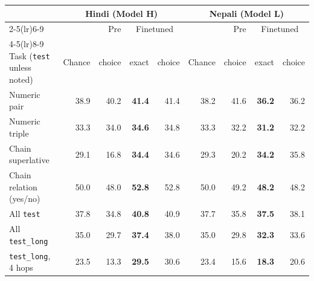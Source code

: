 \begin{tabular}{lrrrrrrrr}
\toprule
& \multicolumn{4}{c}{Hindi (Model H)} & \multicolumn{4}{c}{Nepali (Model L)} \\
\cmidrule(lr){2-5}\cmidrule(lr){6-9}
& & Pre & \multicolumn{2}{c}{Finetuned} & & Pre & \multicolumn{2}{c}{Finetuned} \\
\cmidrule(lr){4-5}\cmidrule(lr){8-9}
Task (\texttt{test} unless noted) & Chance & choice & exact & choice & Chance & choice & exact & choice \\
\midrule
Numeric pair & 38.9 & 40.2 & \textbf{41.4} & 41.4 & 38.2 & 41.6 & \textbf{36.2} & 36.2 \\
Numeric triple & 33.3 & 34.0 & \textbf{34.6} & 34.8 & 33.3 & 32.2 & \textbf{31.2} & 32.2 \\
Chain superlative & 29.1 & 16.8 & \textbf{34.4} & 34.6 & 29.3 & 20.2 & \textbf{34.2} & 35.8 \\
Chain relation (yes/no) & 50.0 & 48.0 & \textbf{52.8} & 52.8 & 50.0 & 49.2 & \textbf{48.2} & 48.2 \\
\midrule
All \texttt{test} & 37.8 & 34.8 & \textbf{40.8} & 40.9 & 37.7 & 35.8 & \textbf{37.5} & 38.1 \\
All \texttt{test\_long} & 35.0 & 29.7 & \textbf{37.4} & 38.0 & 35.0 & 29.8 & \textbf{32.3} & 33.6 \\
\texttt{test\_long}, 4 hops & 23.5 & 13.3 & \textbf{29.5} & 30.6 & 23.4 & 15.6 & \textbf{18.3} & 20.6 \\
\bottomrule
\end{tabular}
